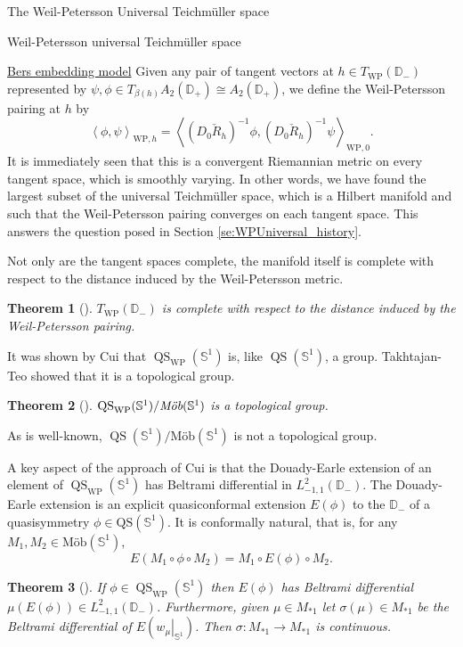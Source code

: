 \documentclass[12pt]{amsart}
\newcommand{\disk}{\ensuremath{\mathbb{D}} } %
\newcommand{\qs}{\operatorname{QS}}
\theoremstyle{plain}
\newtheorem{theorem}{Theorem}[section]
\theoremstyle{definition}
\theoremstyle{remark}
\numberwithin{equation}{section} %
\numberwithin{figure}{section} %
\begin{document}
\begin{section}{The Weil-Petersson Universal Teichm\"uller space}
\begin{subsection}{Weil-Petersson universal Teichm\"uller space}
\begin{subsubsection}{\underline{Bers embedding model}}
 Given any pair of tangent vectors at $h \in T_{\mathrm{WP}}(\disk_-)$ represented by $\psi, \phi \in T_{\beta(h)} A_2(\disk_+) \cong A_2(\disk_+)$, we define the Weil-Petersson pairing at $h$ by 
 \begin{equation} \label{eq:disk_WP_pairing_qd}
   \left< \phi,\psi \right>_{\mathrm{WP},h} = \left< (D_{0}  \check{R}_{h})^{-1} \phi, (D_{0} \check{R}_{h})^{-1} \psi \right>_{\mathrm{WP},0}.   
 \end{equation} 
 It is immediately seen that this is a convergent Riemannian metric on every tangent space, which is smoothly varying. In other words, we have found the largest subset of the universal Teichm\"uller space, which is a Hilbert manifold and such that the Weil-Petersson pairing converges on each tangent space. This answers the question posed in Section \ref{se:WPUniversal_history}.  
 
 Not only are the tangent spaces complete, the manifold itself is complete with respect to the distance induced by the Weil-Petersson metric.
 \begin{theorem}[\cite{Cui}]  \label{th:Cui_completeness} \label{th:WP_universal_Teich_complete}
   $T_{\mathrm{WP}}(\disk_-)$ is complete with respect to the distance induced by the Weil-Petersson pairing.  
 \end{theorem}
 
  
 It was shown by Cui \cite{Cui} that $\qs_{\mathrm{WP}}(\mathbb{S}^1)$ is, like $\qs(\mathbb{S}^1)$, a group. Takhtajan-Teo showed that it is a topological group. 
\begin{theorem}[\cite{Takhtajan_Teo_Memoirs}]   \label{th:WP_is_top_group} $\qs_{\mathrm{WP}}(\mathbb{S}^1)/\emph{M\"ob}(\mathbb{S}^1)$
 is a topological group. 
\end{theorem}
As is well-known, $\qs(\mathbb{S}^1)/\text{M\"ob}(\mathbb{S}^1)$ is not a topological group. 

A key aspect of the approach of Cui is that the Douady-Earle extension of an element of $\qs_{\mathrm{WP}}(\mathbb{S}^1)$ has Beltrami differential in $L^2_{-1,1}(\disk_-)$. The Douady-Earle extension is an explicit quasiconformal extension $E(\phi)$ to the $\disk_-$ of a quasisymmetry $\phi \in \mathrm{QS}(\mathbb{S}^1)$. It is conformally natural, that is, for any $M_1,M_2 \in \text{M\"ob}(\mathbb{S}^1)$, 
\[   E(M_1 \circ \phi \circ M_2) = M_1 \circ E(\phi) \circ M_2. \]
\begin{theorem}[\cite{Cui}] \label{th:Cui_Douady_Earle} 
   If $\phi \in \qs_{\mathrm{WP}}(\mathbb{S}^1)$ then $E(\phi)$ has Beltrami differential $\mu(E(\phi)) \in L^2_{-1,1}(\disk_-)$.  Furthermore, given $\mu \in M_{\ast 1}$ let $\sigma(\mu) \in M_{* 1}$ be the Beltrami differential of $E(\left. w_\mu \right|_{\mathbb{S}^1})$. Then $\sigma:M_{* 1} \rightarrow M_{* 1}$ is continuous. 
\end{theorem}


\end{subsubsection}
\end{subsection}
\end{section}
\end{document}
